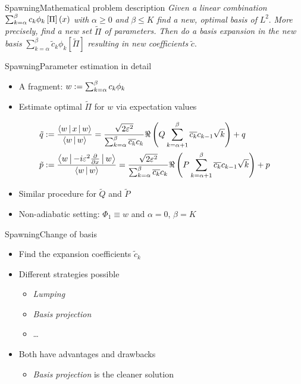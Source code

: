 \documentclass{beamer}
\begin{document}
\begin{frame}{Spawning}{Mathematical problem description}
  \emph{Given a linear combination} $\sum_{k=\alpha}^\beta c_k \phi_k\left[\Pi\right]\left( x \right)$
  \emph{with} $\alpha \geq 0$ \emph{and} $\beta \leq K$ \emph{find
  a new, optimal basis of} $L^2$. \emph{More precisely, find a new set}
  $\tilde{\Pi}$ \emph{of parameters.} \emph{Then do a basis expansion
  in the new basis} $\sum_{k=\alpha}^\beta \tilde{c}_k \phi_k [\tilde{\Pi}]$
  \emph{resulting in new coefficients} $\tilde{c}$.
\end{frame}


\begin{frame}{Spawning}{Parameter estimation in detail}
  \begin{itemize}
    \item A fragment: $w := \sum_{k=\alpha}^\beta c_k \phi_k$
    \item Estimate optimal $\tilde{\Pi}$ for $w$ via expectation values
  \end{itemize}
  \begin{align*}
    \tilde{q} & := \frac{\Braket{w | x | w}}{\Braket{w|w}}
              = \frac{\sqrt{2 \varepsilon^2}}{\sum_{k=\alpha}^\beta \overline{c_k} c_k} \Re \left(Q \sum_{k=\alpha+1}^\beta \overline{c_k} c_{k-1} \sqrt{k} \right) + q \\
    \tilde{p} & := \frac{\Braket{w | -i \varepsilon^2 \frac{\partial}{\partial x} | w}}{\Braket{w|w}}
              = \frac{\sqrt{2 \varepsilon^2}}{\sum_{k=\alpha}^\beta \overline{c_k} c_k} \Re \left(P \sum_{k=\alpha+1}^\beta \overline{c_k} c_{k-1} \sqrt{k} \right) + p
  \end{align*}
  \begin{itemize}
    \item Similar procedure for $\tilde{Q}$ and $\tilde{P}$
    \item Non-adiabatic setting: $\Phi_1 \equiv w$ and $\alpha=0$, $\beta=K$
  \end{itemize}
\end{frame}


\begin{frame}{Spawning}{Change of basis}
  \begin{itemize}
    \item Find the expansion coefficients $\tilde{c}_k$
    \item Different strategies possible
    \begin{itemize}
      \item \emph{Lumping}
      \item \emph{Basis projection}
      \item \ldots
    \end{itemize}
    \item Both have advantages and drawbacks
    \begin{itemize}
      \item \emph{Basis projection} is the cleaner solution
    \end{itemize}
  \end{itemize}
\end{frame}
\end{document}
